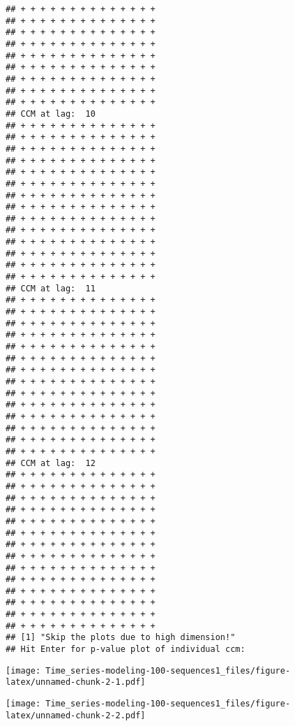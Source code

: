 \documentclass[
]{article}
\newenvironment{Shaded}{\begin{snugshade}}{\end{snugshade}}
\newcommand{\FunctionTok}[1]{\textcolor[rgb]{0.13,0.29,0.53}{\textbf{#1}}}
\newcommand{\NormalTok}[1]{#1}
\newcommand{\OtherTok}[1]{\textcolor[rgb]{0.56,0.35,0.01}{#1}}
\newcommand{\SpecialCharTok}[1]{\textcolor[rgb]{0.81,0.36,0.00}{\textbf{#1}}}
\begin{document}
\begin{verbatim}
## + + + + + + + + + + + + + + 
## + + + + + + + + + + + + + + 
## + + + + + + + + + + + + + + 
## + + + + + + + + + + + + + + 
## + + + + + + + + + + + + + + 
## + + + + + + + + + + + + + + 
## + + + + + + + + + + + + + + 
## + + + + + + + + + + + + + + 
## + + + + + + + + + + + + + + 
## CCM at lag:  10 
## + + + + + + + + + + + + + + 
## + + + + + + + + + + + + + + 
## + + + + + + + + + + + + + + 
## + + + + + + + + + + + + + + 
## + + + + + + + + + + + + + + 
## + + + + + + + + + + + + + + 
## + + + + + + + + + + + + + + 
## + + + + + + + + + + + + + + 
## + + + + + + + + + + + + + + 
## + + + + + + + + + + + + + + 
## + + + + + + + + + + + + + + 
## + + + + + + + + + + + + + + 
## + + + + + + + + + + + + + + 
## + + + + + + + + + + + + + + 
## CCM at lag:  11 
## + + + + + + + + + + + + + + 
## + + + + + + + + + + + + + + 
## + + + + + + + + + + + + + + 
## + + + + + + + + + + + + + + 
## + + + + + + + + + + + + + + 
## + + + + + + + + + + + + + + 
## + + + + + + + + + + + + + + 
## + + + + + + + + + + + + + + 
## + + + + + + + + + + + + + + 
## + + + + + + + + + + + + + + 
## + + + + + + + + + + + + + + 
## + + + + + + + + + + + + + + 
## + + + + + + + + + + + + + + 
## + + + + + + + + + + + + + + 
## CCM at lag:  12 
## + + + + + + + + + + + + + + 
## + + + + + + + + + + + + + + 
## + + + + + + + + + + + + + + 
## + + + + + + + + + + + + + + 
## + + + + + + + + + + + + + + 
## + + + + + + + + + + + + + + 
## + + + + + + + + + + + + + + 
## + + + + + + + + + + + + + + 
## + + + + + + + + + + + + + + 
## + + + + + + + + + + + + + + 
## + + + + + + + + + + + + + + 
## + + + + + + + + + + + + + + 
## + + + + + + + + + + + + + + 
## + + + + + + + + + + + + + + 
## [1] "Skip the plots due to high dimension!"
## Hit Enter for p-value plot of individual ccm:
\end{verbatim}

\texttt{[image: Time\_series-modeling-100-sequences1\_files/figure-latex/unnamed-chunk-2-1.pdf]}

\begin{Shaded}
\end{Shaded}

\texttt{[image: Time\_series-modeling-100-sequences1\_files/figure-latex/unnamed-chunk-2-2.pdf]}

\begin{Shaded}
\end{Shaded}
\end{document}
